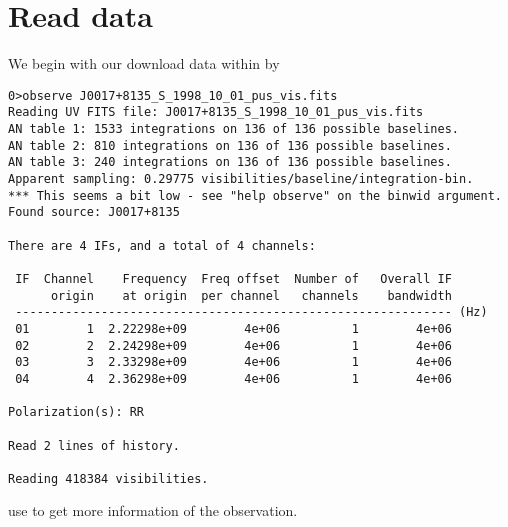 \documentclass[a4paper,11pt]{article}
\begin{document}
\section{Read data}
We begin with our download data within  by 
\tiny
\begin{lstlisting}[language={[ANSI]C}]
0>observe J0017+8135_S_1998_10_01_pus_vis.fits 
Reading UV FITS file: J0017+8135_S_1998_10_01_pus_vis.fits
AN table 1: 1533 integrations on 136 of 136 possible baselines.
AN table 2: 810 integrations on 136 of 136 possible baselines.
AN table 3: 240 integrations on 136 of 136 possible baselines.
Apparent sampling: 0.29775 visibilities/baseline/integration-bin.
*** This seems a bit low - see "help observe" on the binwid argument.
Found source: J0017+8135

There are 4 IFs, and a total of 4 channels:

 IF  Channel    Frequency  Freq offset  Number of   Overall IF
      origin    at origin  per channel   channels    bandwidth
 ------------------------------------------------------------- (Hz)
 01        1  2.22298e+09        4e+06          1        4e+06
 02        2  2.24298e+09        4e+06          1        4e+06
 03        3  2.33298e+09        4e+06          1        4e+06
 04        4  2.36298e+09        4e+06          1        4e+06

Polarization(s): RR

Read 2 lines of history.

Reading 418384 visibilities.

\end{lstlisting}

use  to get more information of the observation.
\end{document}

